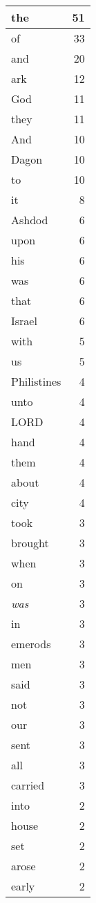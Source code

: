 \begin{center}
\begin{longtable}{l|r}
\hline \hline
\endlastfoot
the & 51 \\ \hline
of & 33 \\ \hline
and & 20 \\ \hline
ark & 12 \\ \hline
God & 11 \\ \hline
they & 11 \\ \hline
And & 10 \\ \hline
Dagon & 10 \\ \hline
to & 10 \\ \hline
it & 8 \\ \hline
Ashdod & 6 \\ \hline
upon & 6 \\ \hline
his & 6 \\ \hline
was & 6 \\ \hline
that & 6 \\ \hline
Israel & 6 \\ \hline
with & 5 \\ \hline
us & 5 \\ \hline
Philistines & 4 \\ \hline
unto & 4 \\ \hline
LORD & 4 \\ \hline
hand & 4 \\ \hline
them & 4 \\ \hline
about & 4 \\ \hline
city & 4 \\ \hline
took & 3 \\ \hline
brought & 3 \\ \hline
when & 3 \\ \hline
on & 3 \\ \hline
\emph{was} & 3 \\ \hline
in & 3 \\ \hline
emerods & 3 \\ \hline
men & 3 \\ \hline
said & 3 \\ \hline
not & 3 \\ \hline
our & 3 \\ \hline
sent & 3 \\ \hline
all & 3 \\ \hline
carried & 3 \\ \hline
into & 2 \\ \hline
house & 2 \\ \hline
set & 2 \\ \hline
arose & 2 \\ \hline
early & 2 \\ \hline

\end{longtable}
\end{center}
